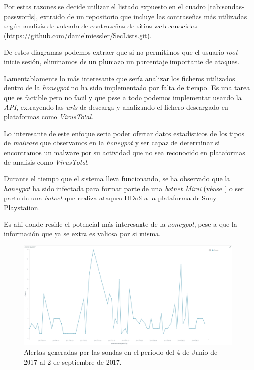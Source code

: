 Por estas razones se decide utilizar el listado expuesto en el cuadro \ref{tab:sondas-passwords}, extraido de un repositorio que incluye las contraseñas
más utilizadas según analisis de volcado de contraseñas de sitios web conocidos (\href{https://github.com/danielmiessler/SecLists.git}{https://github.com/danielmiessler/SecLists.git}).

De estos diagramas podemos extraer que si no permitimos que el usuario \emph{root} inicie sesión, eliminamos de un plumazo un porcentaje importante de ataques.

Lamentablamente lo más interesante que sería analizar los ficheros utilizados dentro de la \emph{honeypot} no ha sido implementado por falta de tiempo. Es una tarea
que es factible pero no facil y que pese a todo podemos implementar usando la \emph{API}, extrayendo las \emph{urls} de descarga y analizando el fichero descargado en plataformas como
\emph{VirusTotal}.

Lo interesante de este enfoque seria poder ofertar datos estadisticos de los tipos de \emph{malware} que observamos en la \emph{honeypot} y ser capaz de determinar si encontramos un malware por
su actividad que no sea reconocido en plataformas de analisis como \emph{VirusTotal}.

Durante el tiempo que el sistema lleva funcionando, se ha observado que la \emph{honeypot} ha sido infectada para formar parte de una \emph{botnet Mirai} (véase \cite{wiki-mirai})
o ser parte de una \emph{botnet} que realiza ataques DDoS a la plataforma de Sony Playstation.

Es ahi donde reside el potencial más interesante de la \emph{honeypot}, pese a que la información que ya se extra es valiosa por si misma.

\begin{figure}
    \centering
      \includegraphics[scale=0.3]{images/ElasticAlertsByDay}
    \caption{Alertas generadas por las sondas en el periodo del 4 de Junio de 2017 al 2 de septiembre de 2017.}
    \label{fig:data-alerts-by-day}
  \end{figure}

